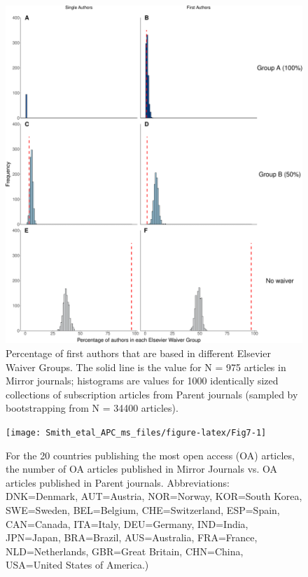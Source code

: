 \documentclass[
  english,
  man]{apa6}
\begin{document}
\begin{figure}

{\centering \includegraphics{Smith_etal_APC_ms_files/figure-latex/Fig6-1} 

}

\caption{Percentage of first authors that are based in different Elsevier Waiver Groups. The solid line is the value for N =  975  articles in Mirror journals; histograms are values for 1000 identically sized collections of subscription articles from Parent journals (sampled by bootstrapping from N =  34400  articles).}\label{fig:Fig6}
\end{figure}

\begin{figure}

{\centering \texttt{[image: Smith\_etal\_APC\_ms\_files/figure-latex/Fig7-1]} 

}

\caption{For the 20 countries publishing the most open access (OA) articles, the number of OA articles published in Mirror Journals vs. OA articles published in Parent journals. Abbreviations: DNK=Denmark, AUT=Austria, NOR=Norway, KOR=South Korea, SWE=Sweden, BEL=Belgium, CHE=Switzerland, ESP=Spain, CAN=Canada, ITA=Italy, DEU=Germany, IND=India, JPN=Japan, BRA=Brazil, AUS=Australia, FRA=France, NLD=Netherlands, GBR=Great Britain, CHN=China, USA=United States of America.)}\label{fig:Fig7}
\end{figure}
\end{document}
